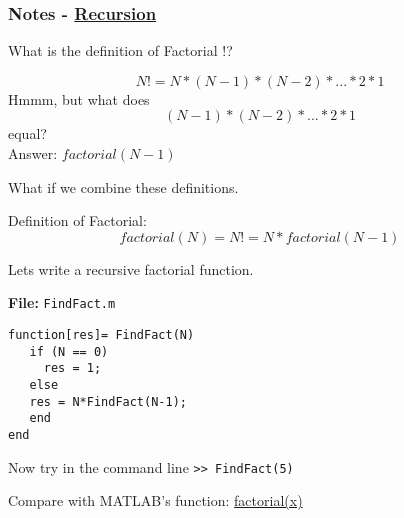 \documentclass[11pt]{beamer}
\begin{document}
\begin{frame}[fragile]
	
	\frametitle{Notes - 
		\href{http://www.mathworks.com/help/ident/ug/algorithms-for-recursive-estimation.html}{Recursion}
	}
	\vspace{-17pt}
	\begin{minipage}[t]{0.54\linewidth}
		\begin{block}{}
		What is the definition of Factorial $!$?
		\end{block}
		\vspace{-11pt}
\[N! = N*(N-1)*(N-2)*...*2*1\]
Hmmm, but what does 
\[(N-1) * (N-2) * ... * 2*1\] equal?\\
Answer: $factorial(N-1)$

What if we combine these definitions.

Definition of Factorial:\\
\[factorial(N)=N!=N*factorial(N-1)\]
	\end{minipage}
	\hspace{7pt}
	\begin{minipage}[t]{0.41\linewidth}
		\begin{block}{}
			Lets write a recursive factorial function.
		\end{block}
		\textbf{File:} \verb|FindFact.m|
		\begin{verbatim}
function[res]= FindFact(N) 
   if (N == 0)  
     res = 1; 
   else 
   res = N*FindFact(N-1); 
   end
end   
\end{verbatim}			
		Now try in the command line
		\verb|>> FindFact(5)|
	\end{minipage}
\begin{exampleblock}{}
	\centering
	Compare with MATLAB's function: \href{http://www.mathworks.com/help/matlab/ref/factorial.html}{factorial(x)}
\end{exampleblock}	
\end{frame}
\end{document}
